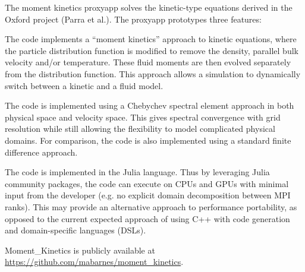 
The moment kinetics proxyapp solves the kinetic-type equations derived in the Oxford project (Parra et al.). The proxyapp prototypes three features:

The code implements a “moment kinetics” approach to kinetic equations, where the particle distribution function is modified to remove the density, parallel bulk velocity and/or temperature. These fluid moments are then evolved separately from the distribution function. This approach allows a simulation to dynamically switch between a kinetic and a fluid model.

The code is implemented using a Chebychev spectral element approach in both physical space and velocity space. This gives spectral convergence with grid resolution while still allowing the flexibility to model complicated physical domains. For comparison, the code is also implemented using a standard finite difference approach.

The code is implemented in the Julia language. Thus by leveraging Julia community packages, the code can execute on CPUs and GPUs with minimal input from the developer (e.g. no explicit domain decomposition between MPI ranks). This may provide an alternative approach to performance portability, as opposed to the current expected approach of using C++ with code generation and domain-specific languages (DSLs).


Moment\_Kinetics is publicly available at \url{https://github.com/mabarnes/moment_kinetics}.
